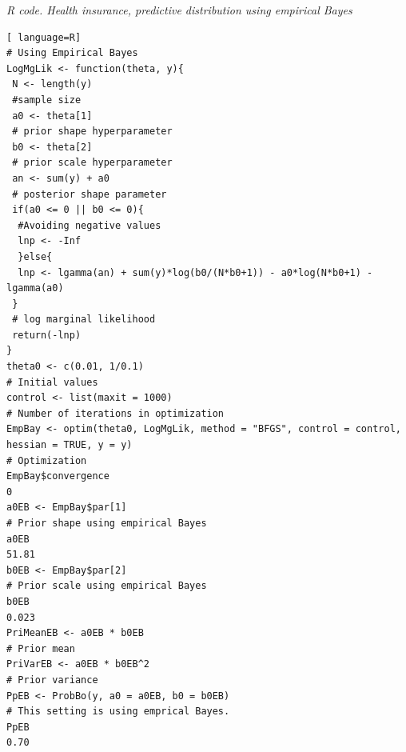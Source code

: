 \begin{tcolorbox}[enhanced,width=4.67in,center upper,
	fontupper=\large\bfseries,drop shadow southwest,sharp corners]
\textit{R code. Health insurance, predictive distribution using empirical Bayes}
\begin{VF}
\begin{lstlisting}[ language=R]
# Using Empirical Bayes
LogMgLik <- function(theta, y){
 N <- length(y) 
 #sample size
 a0 <- theta[1] 
 # prior shape hyperparameter
 b0 <- theta[2] 
 # prior scale hyperparameter
 an <- sum(y) + a0 
 # posterior shape parameter
 if(a0 <= 0 || b0 <= 0){ 
  #Avoiding negative values
  lnp <- -Inf
  }else{
  lnp <- lgamma(an) + sum(y)*log(b0/(N*b0+1)) - a0*log(N*b0+1) - lgamma(a0)
 } 
 # log marginal likelihood
 return(-lnp)
}			
theta0 <- c(0.01, 1/0.1) 
# Initial values
control <- list(maxit = 1000) 
# Number of iterations in optimization
EmpBay <- optim(theta0, LogMgLik, method = "BFGS", control = control, hessian = TRUE, y = y) 
# Optimization
EmpBay$convergence
0
a0EB <- EmpBay$par[1] 
# Prior shape using empirical Bayes
a0EB
51.81
b0EB <- EmpBay$par[2] 
# Prior scale using empirical Bayes
b0EB
0.023
PriMeanEB <- a0EB * b0EB 
# Prior mean
PriVarEB <- a0EB * b0EB^2 
# Prior variance
PpEB <- ProbBo(y, a0 = a0EB, b0 = b0EB) 
# This setting is using emprical Bayes.
PpEB
0.70 
\end{lstlisting}
\end{VF}
\end{tcolorbox} 

